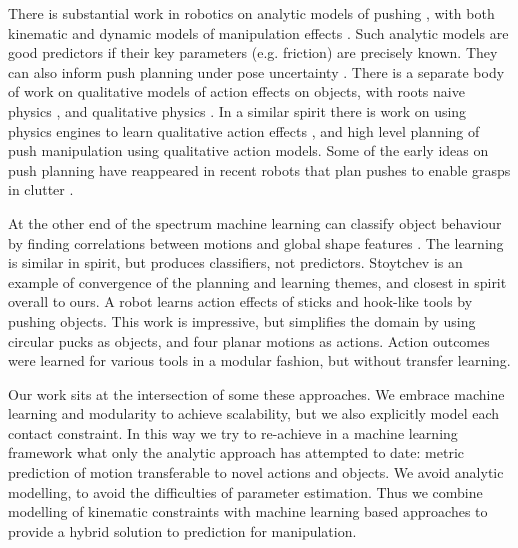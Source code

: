 There is substantial work in robotics on analytic models of pushing \cite{mason_manipulator_1982,lynch_mechanics_1992,peshkin_motion_1988,cappelleri_designing_2006}, with both kinematic and dynamic models of manipulation effects \cite{mason_mechanics_2001}. Such analytic models are good predictors if their key parameters (e.g. friction) are precisely known. They can also inform push planning under pose uncertainty \cite{brost1985planning}. There is a separate body of work on qualitative models of action effects on objects, with roots naive physics \cite{hayes1995second}, and qualitative physics \cite{kuipers1986qualitative}. In a similar spirit there is work on using physics engines to learn qualitative action effects \cite{Mugan-tamd-12}, and high level planning of push manipulation \cite{stillman08ijrr} using qualitative action models. Some of the early ideas on push planning have reappeared in recent robots that plan pushes to enable grasps in clutter \cite{Dogar_2010}.

At the other end of the spectrum machine learning can classify object behaviour by finding correlations between motions and global shape features \cite{fitzpatrick_learning_2003,ridge2010self}. The learning is similar in spirit, but produces classifiers, not predictors. Stoytchev \cite{Stoytchev_affordances_2008} is an example of convergence of the planning and learning themes, and closest in spirit overall to ours. A robot learns action effects of sticks and hook-like tools by pushing objects. This work is impressive, but simplifies the domain by using circular pucks as objects, and four planar motions as actions. Action outcomes were learned for various tools in a modular fashion, but without transfer learning.  

Our work sits at the intersection of some these approaches. We embrace machine learning and modularity to achieve scalability, but we also explicitly model each contact constraint. In this way we try to re-achieve in a machine learning framework what only the analytic approach has attempted to date: metric prediction of motion transferable to novel actions and objects. We avoid analytic modelling, to avoid the difficulties of parameter estimation. Thus we combine modelling of kinematic constraints with machine learning based approaches to provide a hybrid solution to prediction for manipulation.